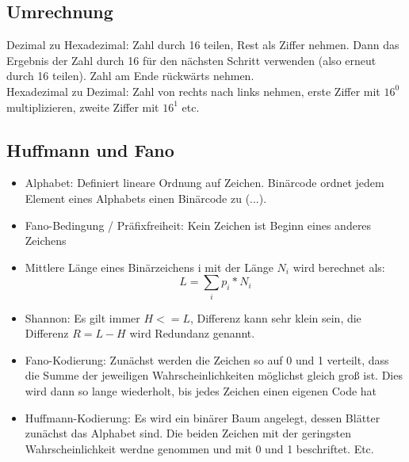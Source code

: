 \documentclass[12pt,landscape]{article}
\begin{document}
\begin{multicols}{3}
\subsection{Umrechnung}
Dezimal zu Hexadezimal: Zahl durch 16 teilen, Rest als Ziffer nehmen. Dann das Ergebnis der Zahl durch 16 für den nächsten Schritt verwenden (also erneut durch 16 teilen). Zahl am Ende rückwärts nehmen.\\
Hexadezimal zu Dezimal: Zahl von rechts nach links nehmen, erste Ziffer mit $16^0$ multiplizieren, zweite Ziffer mit $16^1$ etc.
\subsection{Huffmann und Fano}
\begin{itemize}
\item Alphabet: Definiert lineare Ordnung auf Zeichen. Binärcode ordnet jedem Element eines Alphabets einen Binärcode zu (...).
\item Fano-Bedingung / Präfixfreiheit: Kein Zeichen ist Beginn eines anderes Zeichens
\item Mittlere Länge eines Binärzeichens i mit der Länge $N_i$ wird berechnet als: \[ L = \sum_{i} p_i * N_i \]
\item Shannon: Es gilt immer $H <= L$, Differenz kann sehr klein sein, die Differenz $R = L - H$ wird Redundanz genannt.
\item Fano-Kodierung: Zunächst werden die Zeichen so auf 0 und 1 verteilt, dass die Summe der jeweiligen Wahrscheinlichkeiten möglichst gleich groß ist. Dies wird dann so lange wiederholt, bis jedes Zeichen einen eigenen Code hat
\item Huffmann-Kodierung: Es wird ein binärer Baum angelegt, dessen Blätter zunächst das Alphabet sind. Die beiden Zeichen mit der geringsten Wahrscheinlichkeit werdne genommen und mit 0 und 1 beschriftet. Etc.
\end{itemize}

\end{multicols}
\end{document}
